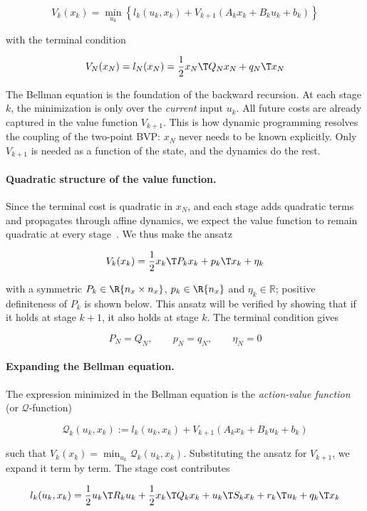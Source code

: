 \[
V_k(x_k) = \min_{u_k} \left\lbrace l_k(u_k, x_k) + V_{k+1}(A_k x_k + B_k u_k + b_k) \right\rbrace
\]

with the terminal condition

\[
V_N(x_N) = l_N(x_N) = \frac{1}{2} x_N\T Q_N x_N + q_N\T x_N
\]

The Bellman equation is the foundation of the backward recursion.
At each stage $k$, the minimization is only over the \textit{current} input $u_k$.
All future costs are already captured in the value function $V_{k+1}$.
This is how dynamic programming resolves the coupling of the two-point BVP:
$x_N$ never needs to be known explicitly.
Only $V_{k+1}$ is needed as a function of the state, and the dynamics do the rest.

\paragraph{Quadratic structure of the value function.}
Since the terminal cost is quadratic in $x_N$, and each stage adds quadratic terms and propagates through affine dynamics, we expect the value function to remain quadratic at every stage~\cite{bertsekas1995dynamic}.
We thus make the ansatz

\[
V_k(x_k) = \frac{1}{2} x_k\T P_k x_k + p_k\T x_k + \eta_k
\]

with a symmetric $P_k \in \R{n_x \times n_x}$, $p_k \in \R{n_x}$ and $\eta_k \in \mathbb{R}$; positive definiteness of $P_k$ is shown below.
This ansatz will be verified by showing that if it holds at stage $k+1$, it also holds at stage $k$.
The terminal condition gives

\[
P_N = Q_N, \qquad p_N = q_N, \qquad \eta_N = 0
\]

\paragraph{Expanding the Bellman equation.}
The expression minimized in the Bellman equation is the \textit{action-value function} (or $\mathcal{Q}$-function)~\cite{watkins1992q}

\[
\mathcal{Q}_k(u_k, x_k) := l_k(u_k, x_k) + V_{k+1}(A_k x_k + B_k u_k + b_k)
\]

such that $V_k(x_k) = \min_{u_k} \mathcal{Q}_k(u_k, x_k)$.
Substituting the ansatz for $V_{k+1}$, we expand it term by term.
The stage cost contributes

\[
l_k(u_k, x_k) = \frac{1}{2} u_k\T R_k u_k + \frac{1}{2} x_k\T Q_k x_k + u_k\T S_k x_k + r_k\T u_k + q_k\T x_k
\]

